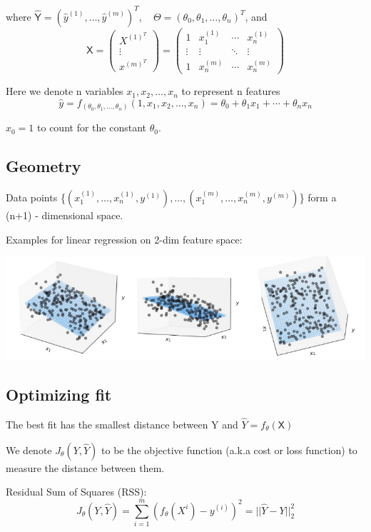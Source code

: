 \documentclass[letterpaper,12pt]{article}
\begin{document}
where $\hat{\mathsf{Y}} = {(\hat{y}^{(1)},\ldots,\hat{y}^{(m)})}^T,\quad \Theta
    = {(\theta_0,\theta_1,\ldots,\theta_n)}^T$, and
\[
    \mathsf{X} =
    \begin{pmatrix}
        X^{(1)^T} \\
        \vdots    \\
        x^{(m)^T}
    \end{pmatrix}
    =
    \begin{pmatrix}
        1      & x_1^{(1)} & \cdots & x_n^{(1)} \\
        \vdots & \vdots    & \ddots & \vdots    \\
        1      & x_n^{(m)} & \cdots & x_n^{(m)}
    \end{pmatrix}
\]

Here we denote n variables $x_1,x_2,\ldots,x_n$ to represent n features
\[
    \hat{y}=f_{(\theta_0,\theta_1,\ldots,\theta_n)}(1,x_1,x_2,\ldots,x_n)=\theta_0+\theta_1x_1+\cdots+\theta_n x_n
\]

$x_0=1$ to count for the constant $\theta_0$.
\subsection{Geometry}
Data points
\{$(x_1^{(1)},\ldots,x_n^{(1)},y^{(1)}),\ldots,(x_1^{(m)},\ldots,x_n^{(m)},y^{(m)})$\}
form a (n+1) - dimensional space.

Examples for linear regression on 2-dim feature space:

\includegraphics[scale = 0.8]{./Image/2-dim_feature_space_example.png}

\subsection{Optimizing fit}

The best fit has the smallest distance between Y and $\hat{Y} =
    f_\theta(\mathsf{X})$

We denote $J_\theta(Y,\hat{Y})$ to be the objective function (a.k.a cost or
loss function) to measure the distance between them.

Residual Sum of Squares (RSS):
\[
    J_\theta(Y,\hat{Y})   = \sum_{i=1}^{m}{(f_\theta(X^{i})-y^{(i)})}^2 = ||\hat{Y}-Y||_2^2
\]
\end{document}
